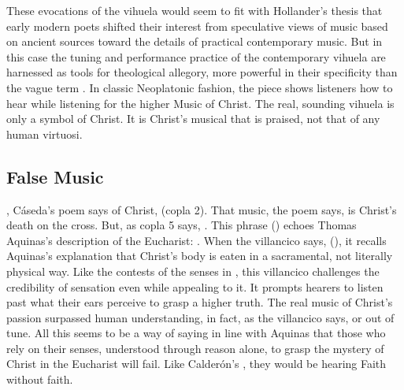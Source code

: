 These evocations of the vihuela would seem to fit with Hollander's thesis that
early modern poets shifted their interest from speculative views of music based
on ancient sources toward the details of practical contemporary music.
But in this case the tuning and performance practice of the contemporary
vihuela are harnessed as tools for theological allegory, more powerful in their
specificity than the vague term .
In classic Neoplatonic fashion, the piece shows listeners how to hear
 while listening for the higher Music of Christ. 
The real, sounding vihuela is only a symbol of Christ.
It is Christ's musical  that is praised, not that of any
human virtuosi.

\subsection{False Music}

, Cáseda's poem says of Christ,
 (copla 2).
That music, the poem says, is Christ's death on the cross.
But, as copla 5 says, .
This phrase () echoes Thomas Aquinas's
description of the Eucharist: .%
    \Autocite[question 75, article 1, ]{Aquinas:Summa3}
When the villancico says,  (),
it recalls Aquinas's explanation that Christ's body is eaten in a sacramental,
not literally physical way.
Like the contests of the senses in , this villancico
challenges the credibility of sensation even while appealing to it.
It prompts hearers to listen past what their ears perceive to grasp a higher
truth.
The real music of Christ's passion surpassed human understanding, in fact, as
the villancico says,  or out of tune.
All this seems to be a way of saying in line with Aquinas that those who rely
on their senses, understood through reason alone, to grasp the mystery of
Christ in the Eucharist will fail.
Like Calderón's , they would be hearing Faith without faith.

